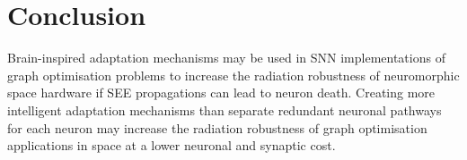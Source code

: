\section{Conclusion}\label{sec:conclusion}
Brain-inspired adaptation mechanisms may be used in SNN implementations of graph optimisation problems to increase the radiation robustness of neuromorphic space hardware if SEE propagations can lead to neuron death. Creating more intelligent adaptation mechanisms than separate redundant neuronal pathways for each neuron may increase the radiation robustness of graph optimisation applications  in space at a lower neuronal and synaptic cost.


